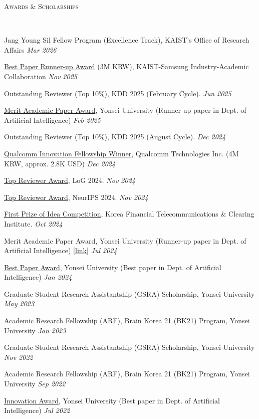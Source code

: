 \documentclass[10pt]{article}
\newenvironment{changemargin}[2]{
  \begin{list}{}{
    \setlength{\topsep}{0pt}
    \setlength{\leftmargin}{#1}
    \setlength{\rightmargin}{#2}
    \setlength{\listparindent}{\parindent}
    \setlength{\itemindent}{\parindent}
    \setlength{\parsep}{\parskip}
  }
  \item[]}{\end{list}
}
\newcommand{\lineover}{
	\begin{changemargin}{-0.05in}{-0.05in}
		\vspace*{-8pt}
		\hrulefill \\
		\vspace*{-2pt}
	\end{changemargin}
}
\newcommand{\header}[1]{
	\begin{changemargin}{-0.5in}{-0.5in}
		\scshape{#1}\\
  	\lineover
	\end{changemargin}
}
\newcommand{\award}[2]{
	{#1} \hfill \emph{#2}\\ \medskip
}
\newenvironment{body} {
	\vspace*{-16pt}
	\begin{changemargin}{-0.25in}{-0.5in}
  }
	{\end{changemargin}
}
\begin{document}
\header{Awards \& Scholarships}
\begin{body}
	\vspace{14pt}
\award{Jang Young Sil Fellow Program (Excellence Track), KAIST's Office of Research Affairs}{Mar 2026}
\award{\href{https://www.jeongwhanchoi.com/assets/award/KAIST-SAMSUNG-BESTPAPER-RUNNERUP.pdf}{Best Paper Runner-up Award} (3M KRW), KAIST-Samsung Industry-Academic Collaboration}{Nov 2025}
\award{Outstanding Reviewer (Top 10\%), KDD 2025 (February Cycle).} {Jun 2025}
\award{\href{https://graduate.yonsei.ac.kr/graduate/board/news.do?mode=view&articleNo=220032&article.offset=0&articleLimit=10}{Merit Academic Paper Award}, Yonsei University (Runner-up paper in Dept. of Artificial Intelligence)} {Feb 2025} 
\award{Outstanding Reviewer (Top 10\%), KDD 2025 (August Cycle).} {Dec 2024}
\award{\href{https://www.qualcomm.com/research/university-relations/innovation-fellowship/2024-south-korea}{Qualcomm Innovation Fellowship Winner}, Qualcomm Technologies Inc. (4M KRW, approx. 2.8K USD)} {Dec 2024} 
\award{\href{https://x.com/LogConference/status/1862602407395697123}{Top Reviewer Award}, LoG 2024.} {Nov 2024}
\award{\href{https://neurips.cc/Conferences/2024/ProgramCommittee\#top-reviewers}{Top Reviewer Award}, NeurIPS 2024.} {Nov 2024}
\award{\href{https://drive.google.com/file/d/1--cUGRX6rB9rc2phbMeIJ7BdHRNCj_au/view?usp=sharing}{First Prize of Idea Competition}, Korea Financial Telecommunications \& Clearing Institute.} {Oct 2024}
\award{Merit Academic Paper Award, Yonsei University (Runner-up paper in Dept. of Artificial Intelligence) \href{https://graduate.yonsei.ac.kr/graduate/board/news.do?mode=view&articleNo=208151&article.offset=0&articleLimit=10}{[link]}} {Jul 2024} 
\award{\href{https://graduate.yonsei.ac.kr/graduate/board/news.do?mode=view&articleNo=181558&article.offset=0&articleLimit=10}{Best Paper Award}, Yonsei University (Best paper in Dept. of Artificial Intelligence) } {Jan 2024} 
\award{Graduate Student Research Assistantship (GSRA) Scholarship, Yonsei University}{May 2023}
\award{Academic Research Fellowship (ARF), Brain Korea 21 (BK21) Program, Yonsei University}{Jan 2023}
\award{Graduate Student Research Assistantship (GSRA) Scholarship, Yonsei University}{Nov 2022}
\award{Academic Research Fellowship (ARF), Brain Korea 21 (BK21) Program, Yonsei University}{Sep 2022}
\award{\href{https://www.yonsei.ac.kr/ocx/news.jsp?mode=view&ar_seq=20220708141917269049&sr_volume=632&list_mode=list&sr_site=S&pager.offset=0&sr_cates=29}{Innovation Award}, Yonsei University (Best paper in Dept. of Artificial Intelligence) }{Jul 2022}

\end{body}
\end{document}
